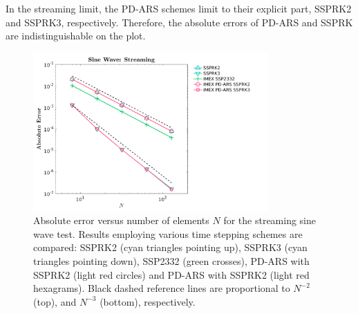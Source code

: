 In the streaming limit, the PD-ARS schemes limit to their explicit part, SSPRK2 and SSPRK3, respectively.
Therefore, the absolute errors of PD-ARS and SSPRK are indistinguishable on the plot.

\begin{figure}[h]
  \centering
    \includegraphics[width=0.8\textwidth]{figures/SineWaveStreaming}
   \caption{Absolute error versus number of elements $N$ for the streaming sine wave test.  Results employing various time stepping schemes are compared: SSPRK2 (cyan triangles pointing up), SSPRK3 (cyan triangles pointing down), SSP2332 (green crosses), PD-ARS with SSPRK2 (light red circles) and PD-ARS with SSPRK2 (light red hexagrams). Black dashed reference lines are proportional to $N^{-2}$ (top), and $N^{-3}$ (bottom), respectively.}
   \label{fig: SineWaveStreaming}
\end{figure}

